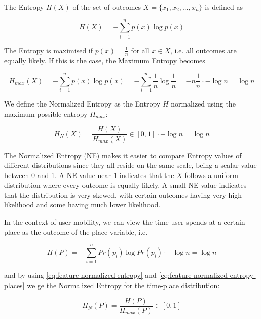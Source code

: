 The Entropy $H(X)$ of the set of outcomes $X = \{x_1, x_2, ..., x_n\}$ is defined as

\begin{equation}
\label{eq:feature-entropy}
H(X) = -\sum_{i=1}^{n} p(x) \log p(x)
\end{equation}

The Entropy is maximised if $p(x) = \frac{1}{n}$ for all $x \in X$, i.e. all outcomes are equally likely. If this is the case, the Maximum Entropy becomes 

\begin{equation}
\label{eq:feature-entropy-max}
H_{max}(X) = - \sum_{i=1}^{n} p(x) \log p(x) = - \sum_{i=1}^{n} \frac{1}{n} \log \frac{1}{n} = -n \frac{1}{n} \cdot -\log n = \log n 
\end{equation}

We define the Normalized Entropy as the Entropy $H$ normalized using the maximum possible entropy $H_{max}$:

\begin{equation}
\label{eq:feature-normalized-entropy}
H_N(X) = \frac{H(X)}{H_{max}(X)} \in [0,1]
\cdot -\log n = \log n 
\end{equation}

The Normalized Entropy (NE) makes it easier to compare Entropy values of different distributions since they all reside on the same scale, being a scalar value between  0 and 1. A NE value near 1 indicates that the $X$ follows a uniform distribution where every outcome is equally likely. A small NE value indicates that the distribution is very skewed, with certain outcomes having very high likelihood and some having much lower likelihood. 

In the context of user mobility, we can view the time user spends at a certain place as the outcome of the place variable, i.e. 

\begin{equation}
\label{eq:feature-normalized-entropy-places}
H(P) = - \sum_{i=1}^{n} Pr(p_i) \log Pr(p_i)
\cdot -\log n = \log n 
\end{equation}

and by using \eqref{eq:feature-normalized-entropy} and \eqref{eq:feature-normalized-entropy-places} we ge the Normalized Entropy for the time-place distribution:

\begin{equation}
\label{eq:feature-normalized-entropy}
H_N(P) = \frac{H(P)}{H_{max}(P)} \in [0,1]
\end{equation}

